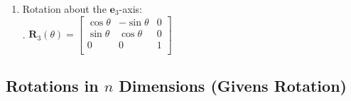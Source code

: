 \begin{enumerate}
    \item Rotation about the $\bm{e}_3$-axis:
    \hfill \cite{mfml/book/mml/Deisenroth-Faisal-Ong}
    \\
    .\hfill
    $
        \bm{R}_3(\theta) 
        = \begin{bmatrix}
        \cos \theta &   -\sin \theta & 0\\
        \sin \theta &  \cos \theta & 0\\
        0 & 0 & 1 \\
        \end{bmatrix}
    $
    \hfill \cite{mfml/book/mml/Deisenroth-Faisal-Ong}
    
\end{enumerate}


\subsection{Rotations in $n$ Dimensions (Givens Rotation)}

